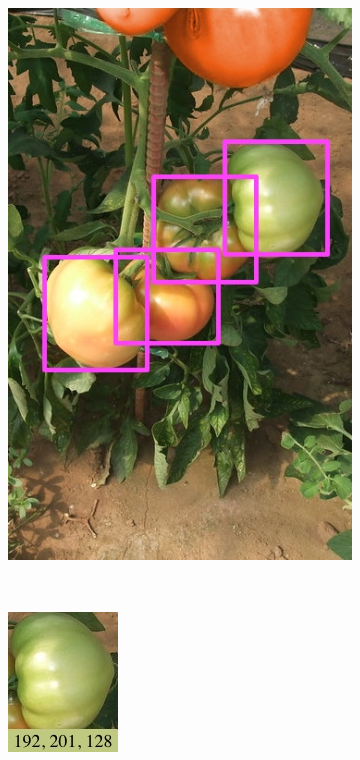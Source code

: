 \begin{figure}[t]
\begin{subfigure}[b]{0.24\linewidth}
    \includegraphics[width=\textwidth]{1}
  \end{subfigure}
  \hspace{\fill}
  ~
  \begin{subfigure}[b]{0.28\linewidth}
    \includegraphics[width=.5\textwidth]{2a}~

\end{subfigure}
\end{figure}
